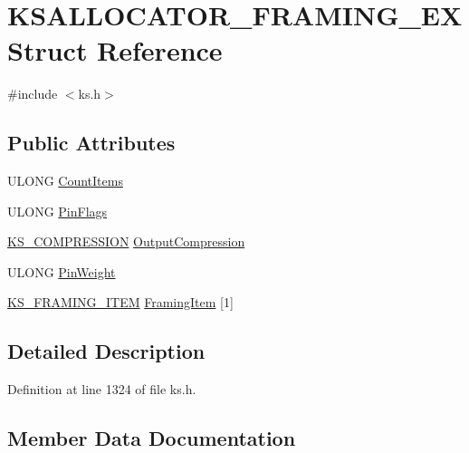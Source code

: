 \hypertarget{struct_k_s_a_l_l_o_c_a_t_o_r___f_r_a_m_i_n_g___e_x}{}\section{K\+S\+A\+L\+L\+O\+C\+A\+T\+O\+R\+\_\+\+F\+R\+A\+M\+I\+N\+G\+\_\+\+EX Struct Reference}
\label{struct_k_s_a_l_l_o_c_a_t_o_r___f_r_a_m_i_n_g___e_x}


{\ttfamily \#include $<$ks.\+h$>$}

\subsection*{Public Attributes}
\begin{DoxyCompactItemize}
\item 
U\+L\+O\+NG \hyperlink{struct_k_s_a_l_l_o_c_a_t_o_r___f_r_a_m_i_n_g___e_x_aefe19a295738563a5e0de301cf32f764}{Count\+Items}
\item 
U\+L\+O\+NG \hyperlink{struct_k_s_a_l_l_o_c_a_t_o_r___f_r_a_m_i_n_g___e_x_a0afe8c8de7e36169d2e631f11a2630e8}{Pin\+Flags}
\item 
\hyperlink{struct_k_s___c_o_m_p_r_e_s_s_i_o_n}{K\+S\+\_\+\+C\+O\+M\+P\+R\+E\+S\+S\+I\+ON} \hyperlink{struct_k_s_a_l_l_o_c_a_t_o_r___f_r_a_m_i_n_g___e_x_a01232f5efe7e2a715465637d92368ae0}{Output\+Compression}
\item 
U\+L\+O\+NG \hyperlink{struct_k_s_a_l_l_o_c_a_t_o_r___f_r_a_m_i_n_g___e_x_affcf03feed631448f9c5ffb86569801a}{Pin\+Weight}
\item 
\hyperlink{struct_k_s___f_r_a_m_i_n_g___i_t_e_m}{K\+S\+\_\+\+F\+R\+A\+M\+I\+N\+G\+\_\+\+I\+T\+EM} \hyperlink{struct_k_s_a_l_l_o_c_a_t_o_r___f_r_a_m_i_n_g___e_x_a9662357d782ff687285cdc1e628ae290}{Framing\+Item} \mbox{[}1\mbox{]}
\end{DoxyCompactItemize}


\subsection{Detailed Description}


Definition at line 1324 of file ks.\+h.



\subsection{Member Data Documentation}
